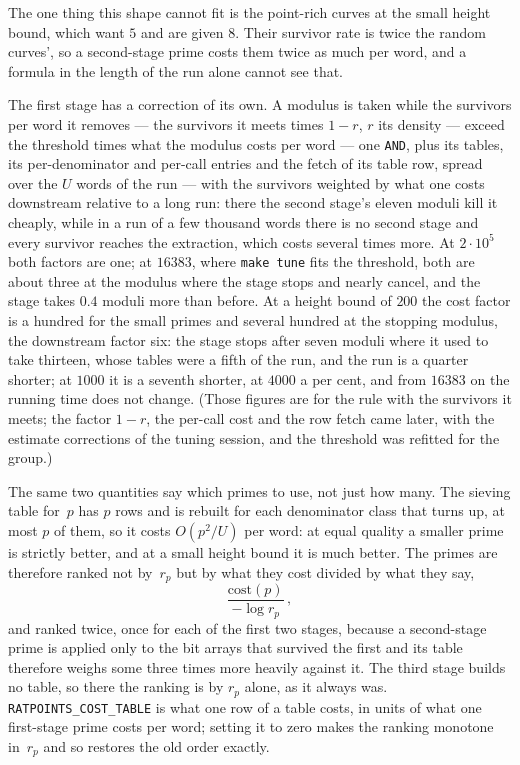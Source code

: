 \documentclass[12pt,a4paper,oneside]{amsart}
\begin{document}
The one thing this shape cannot fit is the point-rich curves at the small
height bound, which want $5$ and are given $8$. Their survivor rate is twice
the random curves', so a second-stage prime costs them twice as much per
word, and a formula in the length of the run alone cannot see that.

The first stage has a correction of its own. A modulus is taken while the
survivors per word it removes --- the survivors it meets times $1-r$, $r$ its
density --- exceed the threshold times what the modulus costs per word ---
one \texttt{AND}, plus its tables, its per-denominator and per-call entries
and the fetch of its table row, spread over the $U$ words of the run --- with
the survivors weighted by what one costs downstream relative to a long run: there the second stage's eleven
moduli kill it cheaply, while in a run of a few thousand words there is no
second stage and every survivor reaches the extraction, which costs several
times more. At $2\cdot 10^5$ both factors are one; at $16383$, where
\texttt{make tune} fits the threshold, both are about three at the modulus
where the stage stops and nearly cancel, and the stage takes $0.4$ moduli
more than before. At a height bound of $200$ the cost factor is a hundred for
the small primes and several hundred at the stopping modulus, the downstream
factor six: the stage stops after seven moduli where it used to take
thirteen, whose tables were a fifth of the run, and the run is a quarter
shorter; at $1000$ it is a seventh shorter, at $4000$ a per cent, and from
$16383$ on the running time does not change. (Those figures are for the rule
with the survivors it meets; the factor $1-r$, the per-call cost and the row
fetch came later, with the estimate corrections of the tuning session, and
the threshold was refitted for the group.)

The same two quantities say which primes to use, not just how many. The
sieving table for~$p$ has $p$ rows and is rebuilt for each denominator class
that turns up, at most $p$ of them, so it costs $O(p^2/U)$ per word: at equal
quality a smaller prime is strictly better, and at a small height bound it is
much better. The primes are therefore ranked not by~$r_p$ but by what they
cost divided by what they say,
\[ \frac{\text{cost}(p)}{-\log r_p} \,, \]
and ranked twice, once for each of the first two stages, because a
second-stage prime is applied only to the bit arrays that survived the first
and its table therefore weighs some three times more heavily against it. The
third stage builds no table, so there the ranking is by $r_p$ alone, as it
always was. \texttt{RATPOINTS\_COST\_TABLE} is what one row of a table costs,
in units of what one first-stage prime costs per word; setting it to zero
makes the ranking monotone in~$r_p$ and so restores the old order exactly.
\end{document}

